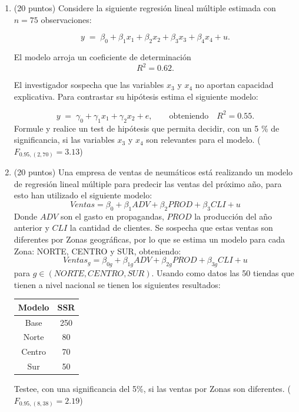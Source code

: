 \documentclass[10pt,a4paper]{article}
\begin{document}
\begin{enumerate}
\item (20 puntos) Considere la siguiente regresión lineal múltiple estimada con \(n = 75\) observaciones:

$$
y \;=\; \beta_{0} + \beta_{1}x_{1} + \beta_{2}x_{2} + \beta_{3}x_{3} + \beta_{4}x_{4} + u.
$$

El modelo arroja un coeficiente de determinación
\[
R^2 = 0.62.
\]

El investigador sospecha que las variables \(x_{3}\) y \(x_{4}\) no aportan capacidad explicativa.  
Para contrastar su hipótesis estima el siguiente modelo:

\[
y \;=\; \gamma_{0} + \gamma_{1}x_{1} + \gamma_{2}x_{2} + e,
\qquad\text{obteniendo}\quad
R^2 = 0.55.
\]
Formule y realice un test de hipótesis que permita decidir, con un 5 \% de significancia, si las variables \(x_{3}\) y \(x_{4}\) son relevantes para el modelo. ($F_{0.95,(2,70)}=3.13$)

\item (20 puntos) Una empresa de ventas de neumáticos está realizando un modelo de regresión lineal múltiple para predecir las ventas del próximo año, para esto han utilizado el siguiente modelo:
$$Ventas = \beta_0 + \beta_1ADV + \beta_2PROD+\beta_3CLI + u$$
Donde $ADV$ son el gasto en propagandas, $PROD$ la producción del año anterior y $CLI$ la cantidad de clientes. Se sospecha que estas ventas son diferentes por Zonas geográficas, por lo que se estima un modelo para cada Zona: NORTE, CENTRO y SUR, obteniendo: 
$$Ventas_{g} = \beta_{0g} + \beta_{1g}ADV + \beta_{2g}PROD+\beta_{3g}CLI + u$$
para $g \in {(NORTE,CENTRO,SUR)}$. Usando como datos las 50 tiendas que tienen a nivel nacional se tienen los siguientes resultados:

\begin{center}
    \begin{tabular}{|c|c|}
    \hline
        Modelo & SSR \\
        \hline
        Base & 250 \\
        \hline
        Norte & 80 \\
        \hline
        Centro & 70 \\
        \hline
        Sur & 50 \\
        \hline
    \end{tabular}
\end{center}
Testee, con una significancia del 5\%, si las ventas por Zonas son diferentes. ($F_{0.95,(8,38)}=2.19$)
\end{enumerate}
\end{document}
